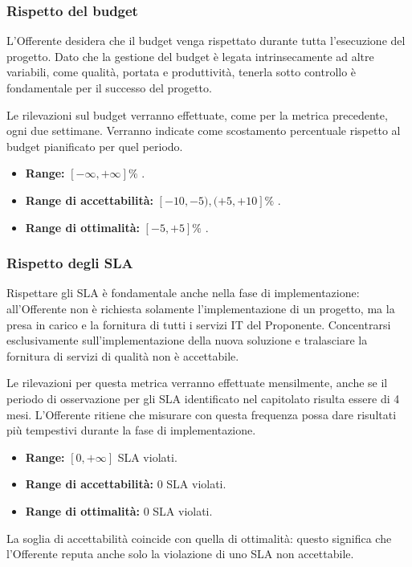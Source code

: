 			\subsubsection{Rispetto del budget}
            	L'Offerente desidera che il budget venga rispettato durante tutta l'esecuzione del progetto. Dato che la gestione del budget è legata intrinsecamente ad altre variabili, come qualità, portata e produttività, tenerla sotto controllo è fondamentale per il successo del progetto.

                
                Le rilevazioni sul budget verranno effettuate, come per la metrica precedente, ogni due settimane. Verranno indicate come scostamento percentuale rispetto al budget pianificato per quel periodo.
                \begin{itemize}
            		\item \textbf{Range:} $[-\infty, +\infty] \%$ .
                    \item \textbf{Range di accettabilità:} $[-10, -5), (+5, +10] \%$ .
                    \item \textbf{Range di ottimalità:} $[-5, +5] \%$ .
            	\end{itemize}
			\subsubsection{Rispetto degli SLA}
            	Rispettare gli SLA è fondamentale anche nella fase di implementazione: all'Offerente non è richiesta solamente l'implementazione di un progetto, ma la presa in carico e la fornitura di tutti i servizi IT del Proponente. Concentrarsi esclusivamente sull'implementazione della nuova soluzione e tralasciare la fornitura di servizi di qualità non è accettabile.

                
                Le rilevazioni per questa metrica verranno effettuate mensilmente, anche se il periodo di osservazione per gli SLA identificato nel capitolato risulta essere di 4 mesi. L'Offerente ritiene che misurare con questa frequenza possa dare risultati più tempestivi durante la fase di implementazione.
                \begin{itemize}
            		\item \textbf{Range:} $[0, +\infty]$ SLA violati.
                    \item \textbf{Range di accettabilità:} 0 SLA violati.
                    \item \textbf{Range di ottimalità:} 0 SLA violati.
            	\end{itemize}
                La soglia di accettabilità coincide con quella di ottimalità: questo significa che l'Offerente reputa anche solo la violazione di uno SLA non accettabile.
                

